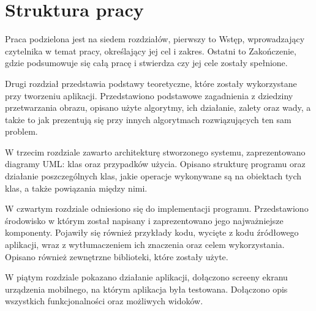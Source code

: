 \documentclass[eng,oneside]{mgr}
\begin{document}
\section{Struktura pracy}
Praca podzielona jest na siedem rozdziałów, pierwszy to Wstęp, wprowadzający czytelnika w temat pracy, określający jej cel i zakres. Ostatni to Zakończenie, gdzie podsumowuje się całą pracę i stwierdza czy jej cele zostały spełnione. 
\par Drugi rozdział przedstawia podstawy teoretyczne, które zostały wykorzystane przy tworzeniu aplikacji. Przedstawiono podstawowe zagadnienia z dziedziny przetwarzania obrazu, opisano użyte algorytmy, ich działanie, zalety oraz wady, a także to jak prezentują się przy innych algorytmach rozwiązujących ten sam problem.
\par W trzecim rozdziale zawarto architekturę stworzonego systemu, zaprezentowano diagramy UML: klas oraz przypadków użycia. Opisano strukturę programu oraz działanie poszczególnych klas, jakie operacje wykonywane są na obiektach tych klas, a także powiązania między nimi. 
\par W czwartym rozdziale odniesiono się do implementacji programu. Przedstawiono środowisko w którym został napisany i zaprezentowano jego najważniejsze komponenty. Pojawiły się również przykłady kodu, wycięte z kodu źródłowego aplikacji, wraz z wytłumaczeniem ich znaczenia oraz celem wykorzystania. Opisano również zewnętrzne biblioteki, które zostały użyte.
\par W piątym rozdziale pokazano działanie aplikacji, dołączono screeny ekranu urządzenia mobilnego, na którym aplikacja była testowana. Dołączono opis wszystkich funkcjonalności oraz możliwych widoków. 
\end{document}
